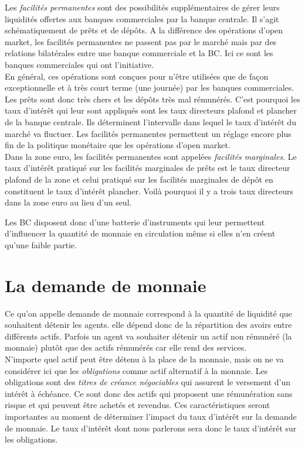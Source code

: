 \documentclass[10pt]{book}
\begin{document}
\begin{enumerate}
    Les \textit{facilités permanentes} sont des possibilités supplémentaires de gérer leurs liquidités offertes aux banques commerciales par la banque centrale. Il s'agit schématiquement de prêts et de dépôts. A la différence des opérations d'open market, les facilités permanentes ne passent pas par le marché mais par des relations bilatérales entre une banque commerciale et la BC. Ici ce sont les banques commerciales qui ont l'initiative. \\
    En général, ces opérations sont conçues pour n'être utilisées que de façon exceptionnelle et à très court terme (une journée) par les banques commerciales. Les prêts sont donc très chers et les dépôts très mal rémunérés. C'est pourquoi les taux d'intérêt qui leur sont appliqués sont les taux directeurs plafond et plancher de la banque centrale. Ils déterminent l'intervalle dans lequel le taux d'intérêt du marché va fluctuer. Les facilités permanentes permettent un réglage encore plus fin de la politique monétaire que les opérations d'open market. \\
    Dans la zone euro, les facilités permanentes sont appelées \textit{facilités marginales}. Le taux d'intérêt pratiqué sur les facilités marginales de prêts est le taux directeur plafond de la zone et celui pratiqué sur les facilités marginales de dépôt en constituent le taux d'intérêt plancher. Voilà pourquoi il y a trois taux directeurs dans la zone euro au lieu d'un seul.
\end{enumerate}
Les BC disposent donc d'une batterie d'instruments qui leur permettent d'influencer la quantité de monnaie en circulation même si elles n'en créent qu'une faible partie.

\section{La demande de monnaie}
Ce qu'on appelle demande de monnaie correspond à la quantité de liquidité que souhaitent détenir les agents. elle dépend donc de la répartition des avoirs entre différents actifs. Parfois un agent va souhaiter détenir un actif non rémunéré (la monnaie) plutôt que des actifs rémunérés car elle rend des services. \\
N'importe quel actif peut être détenu à la place de la monnaie, mais on ne va considérer ici que les \textit{obligations} comme actif alternatif à la monnaie. Les obligations sont des \textit{titres de créance négociables} qui assurent le versement d'un intérêt à échéance. Ce sont donc des actifs qui proposent une rémunération sans risque et qui peuvent être achetés et revendus. Ces caractéristiques seront importantes au moment de déterminer l'impact du taux d'intérêt sur la demande de monnaie. Le taux d'intérêt dont nous parlerons sera donc le taux d'intérêt sur les obligations.
\end{document}
